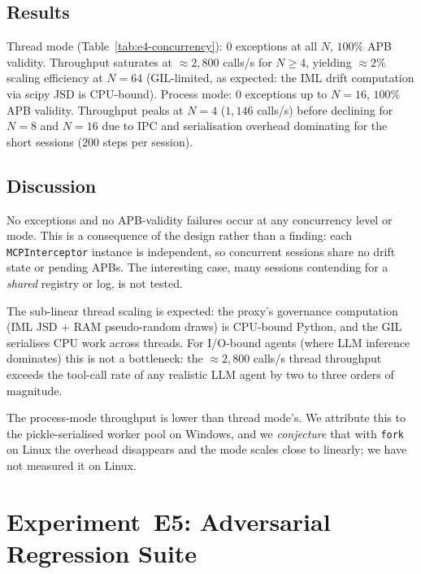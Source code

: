 \documentclass[11pt]{article}
\begin{document}
\subsection{Results}



\noindent
Thread mode (Table~\ref{tab:e4-concurrency}): $0$ exceptions at all $N$,
$100\%$ APB validity.
Throughput saturates at $\approx 2{,}800$ calls/s for $N \ge 4$,
yielding $\approx 2\%$ scaling efficiency at $N{=}64$ (GIL-limited, as expected:
the IML drift computation via scipy JSD is CPU-bound).
Process mode: $0$ exceptions up to $N{=}16$, $100\%$ APB validity.
Throughput peaks at $N{=}4$ ($1{,}146$ calls/s) before declining for $N{=}8$
and $N{=}16$ due to IPC and serialisation overhead dominating for the
short sessions ($200$ steps per session).

\subsection{Discussion}

No exceptions and no APB-validity failures occur at any concurrency
level or mode. This is a consequence of the design rather than a
finding: each \texttt{MCPInterceptor} instance is independent, so
concurrent sessions share no drift state or pending APBs. The
interesting case, many sessions contending for a \emph{shared} registry
or log, is not tested.

The sub-linear thread scaling is expected: the proxy's governance
computation (IML JSD + RAM pseudo-random draws) is CPU-bound Python,
and the GIL serialises CPU work across threads.
For I/O-bound agents (where LLM inference dominates) this is not a
bottleneck: the $\approx 2{,}800$ calls/s thread throughput exceeds the
tool-call rate of any realistic LLM agent by two to three orders of magnitude.

The process-mode throughput is lower than thread mode's. We attribute
this to the pickle-serialised worker pool on Windows, and we
\emph{conjecture} that with \texttt{fork} on Linux the overhead
disappears and the mode scales close to linearly; we have not measured
it on Linux.

\section{Experiment~E5: Adversarial Regression Suite}
\label{sec:exp5}
\end{document}
